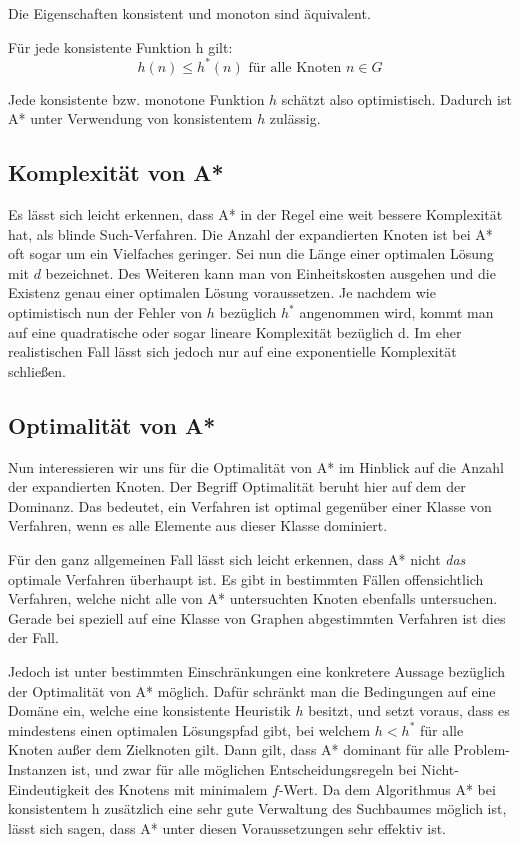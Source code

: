 \begin{theor}
	Die Eigenschaften konsistent und monoton sind äquivalent.
\end{theor}

\begin{theor}
	Für jede konsistente Funktion h gilt: \[h(n)\leq h^{*}(n)\textrm{ für alle Knoten } n \in G\]
\end{theor}
Jede konsistente bzw. monotone Funktion $h$ schätzt also optimistisch. Dadurch ist A* unter Verwendung von konsistentem $h$ zulässig.

\subsection{Komplexität von A*}

Es lässt sich leicht erkennen, dass A* in der Regel eine weit bessere Komplexität hat, als blinde Such-Verfahren. Die Anzahl der expandierten Knoten ist bei A* oft sogar um ein Vielfaches geringer. Sei nun die Länge einer optimalen Lösung mit $d$ bezeichnet. Des Weiteren kann man von Einheitskosten ausgehen und die Existenz genau einer optimalen Lösung voraussetzen.
Je nachdem wie optimistisch nun der Fehler von $h$ bezüglich $h^{*}$ angenommen wird, kommt man auf eine quadratische oder sogar lineare Komplexität bezüglich d. Im eher realistischen Fall lässt sich jedoch nur auf eine exponentielle Komplexität schließen.
\subsection{Optimalität von A*}

Nun interessieren wir uns für die Optimalität von A* im Hinblick auf die Anzahl der expandierten Knoten.
Der Begriff Optimalität beruht hier auf dem der Dominanz. Das bedeutet, ein Verfahren ist optimal gegenüber einer Klasse von Verfahren, wenn es alle Elemente aus dieser Klasse dominiert.

Für den ganz allgemeinen Fall lässt sich leicht erkennen, dass A* nicht \textit{das} optimale Verfahren überhaupt ist. Es gibt in bestimmten Fällen offensichtlich Verfahren, welche nicht alle von A* untersuchten Knoten ebenfalls untersuchen. Gerade bei speziell auf eine Klasse von Graphen abgestimmten Verfahren ist dies der Fall.

Jedoch ist unter bestimmten Einschränkungen eine konkretere Aussage bezüglich der Optimalität von A* möglich. Dafür schränkt man die Bedingungen auf eine Domäne ein, welche eine konsistente Heuristik $h$ besitzt, und setzt voraus, dass es mindestens einen optimalen Lösungspfad gibt, bei welchem $h < h^{*}$ für alle Knoten außer dem Zielknoten gilt. Dann gilt, dass A* dominant für alle Problem-Instanzen ist, und zwar für alle möglichen Entscheidungsregeln bei Nicht-Eindeutigkeit des Knotens mit minimalem $f$-Wert. Da dem Algorithmus A* bei konsistentem h zusätzlich eine sehr gute Verwaltung des Suchbaumes möglich ist, lässt sich sagen, dass A* unter diesen Voraussetzungen sehr effektiv ist.

